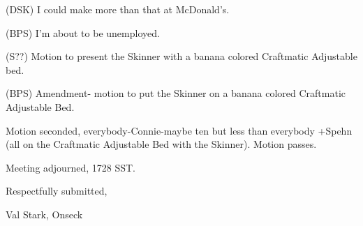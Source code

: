\documentclass[12pt]{article}
\begin{document}
(DSK) I could make more than that at McDonald's.

(BPS) I'm about to be unemployed.

(S??) Motion to present the Skinner with a banana colored Craftmatic Adjustable bed.

(BPS) Amendment- motion to put the Skinner on a banana colored Craftmatic Adjustable Bed.

Motion seconded, everybody-Connie-maybe ten but less than everybody +Spehn (all on the Craftmatic Adjustable Bed with the Skinner). Motion passes.

\vspace{12pt}

\noindent
Meeting adjourned, 1728 SST.

\vspace{18pt}

\centerline{Respectfully submitted,}
\centerline{Val Stark, Onseck}
\end{document}
